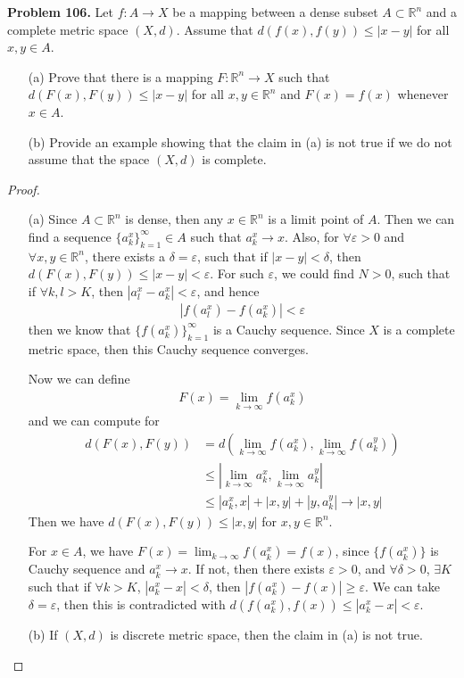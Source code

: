 \documentclass[12pt,leqno]{amsart}
\theoremstyle{definition}
\numberwithin{equation}{subsection}
\begin{document}
\noindent
{\bf Problem 106.}
Let $f:A\to X$ be a mapping between a dense subset $A\subset\mathbb{R}^n$ and a complete metric space $(X,d)$. Assume that $d(f(x),f(y))\leq |x-y|$ for all $x,y\in A$.
\begin{itemize}
\item[(a)] Prove that there is a mapping $F:\mathbb{R}^n\to X$ such that $d(F(x),F(y))\leq |x-y|$ for all $x,y\in \mathbb{R}^n$ and $F(x)=f(x)$ whenever $x\in A$.
\item[(b)] Provide an example showing that the claim in (a) is not true if we do not assume that the space $(X,d)$ is complete.
\end{itemize}
\begin{proof}
~\begin{itemize}
    \item[(a)] Since $A\subset \mathbb{R}^n$ is dense, then any $x\in \mathbb{R}^n$ is a limit point of $A$. Then we can find a sequence $\{a^x_k\}^\infty_{k=1}\in A$ such that $a^x_k\to x$. Also, for $\forall \varepsilon > 0$ and $\forall x,y\in\mathbb{R}^n$, there exists a $\delta =\varepsilon$, such that if $|x-y| <\delta$, then $d(F(x),F(y)) \leq |x-y| < \varepsilon$. For such $\varepsilon$, we could find $N > 0$, such that if $\forall k,l > K$, then $|a^x_l - a^x_k| < \varepsilon$, and hence
    \begin{align*}
        \left|f(a^x_l) - f(a^x_k)\right| < \varepsilon
    \end{align*}
    then we know that $\{f(a^x_k)\}^\infty_{k=1}$ is a Cauchy sequence. Since $X$ is a complete metric space, then this Cauchy sequence converges. 
    
    Now we can define 
    \begin{align*}
        F(x) = \lim_{k\to\infty}f(a^x_k)
    \end{align*}
    and we can compute for
    \begin{align*}
        d(F(x),F(y)) & = d\left(\lim_{k\to\infty}f(a^x_k), \lim_{k\to\infty}f(a^y_k)\right) \\
        & \leq \left|\lim_{k\to\infty}a^x_k, \lim_{k\to\infty}a^y_k\right| \\
        & \leq \left|a^x_k, x\right| + \left|x, y\right| + \left|y, a^y_k\right| \rightarrow \left|x, y\right|
    \end{align*}
    Then we have $d(F(x),F(y)) \leq \left|x, y\right|$ for $x,y\in\mathbb{R}^n$. 
    
    For $x\in A$, we have $F(x) = \lim_{k\to\infty}f(a^x_k) = f(x)$, since $\{f(a^x_k)\}$ is Cauchy sequence and $a^x_k\to x$. If not, then there exists $\varepsilon > 0$, and $\forall \delta > 0$, $\exists K$ such that if $\forall k > K$, $\left|a^x_k - x\right| < \delta$, then $\left|f(a^x_k) - f(x)\right| \geq \varepsilon$. We can take $\delta = \varepsilon$, then this is contradicted with $d(f(a^x_k),f(x))\leq |a^x_k - x| < \varepsilon$.
    \item[(b)] If $(X,d)$ is discrete metric space, then the claim in (a) is not true. 
\end{itemize}
\end{proof}
\end{document}
